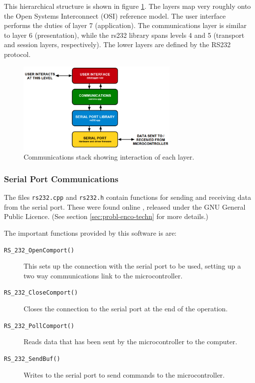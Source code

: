 \documentclass[a4paper,10pt]{article}  %
\begin{document}
This hierarchical structure is shown in figure
\ref{fig:commsprotocol}. The layers map very roughly onto the Open
Systems Interconnect (OSI) reference model. The user interface
performs the duties of layer 7 (application). The communications layer
is similar to layer 6 (presentation), while the rs232 library spans
levels 4 and 5 (transport and session layers, respectively). The lower
layers are defined by the RS232 protocol.

\begin{figure}[!htb]
  \begin{center}
    \includegraphics[width=0.7\textwidth]{CommunicationsProtocol.png}
  \end{center}
  \caption{Communications stack showing interaction of each layer.}
  \label{fig:commsprotocol}
\end{figure}

\subsubsection{Serial Port Communications}

The files \texttt{rs232.cpp} and \texttt{rs232.h} contain functions for
sending and receiving data from the serial port. These were found
online \cite{rs232_lib}, released under the GNU General Public
Licence. (See section \ref{sec:probl-enco-techn} for more details.)

The important functions provided by this software is are:
\begin{description}
  \item[\texttt{RS\_232\_OpenComport()}]
    This sets up the connection with the serial port to be used,
    setting up a two way communications link to the microcontroller.
  \item[\texttt{RS\_232\_CloseComport()}] Closes the connection to the
    serial port at the end of the operation.
  \item[\texttt{RS\_232\_PollComport()}] Reads data that has been sent
    by the microcontroller to the computer.
  \item[\texttt{RS\_232\_SendBuf()}] Writes to the serial port to send
    commands to the microcontroller.
\end{description}
\end{document}
